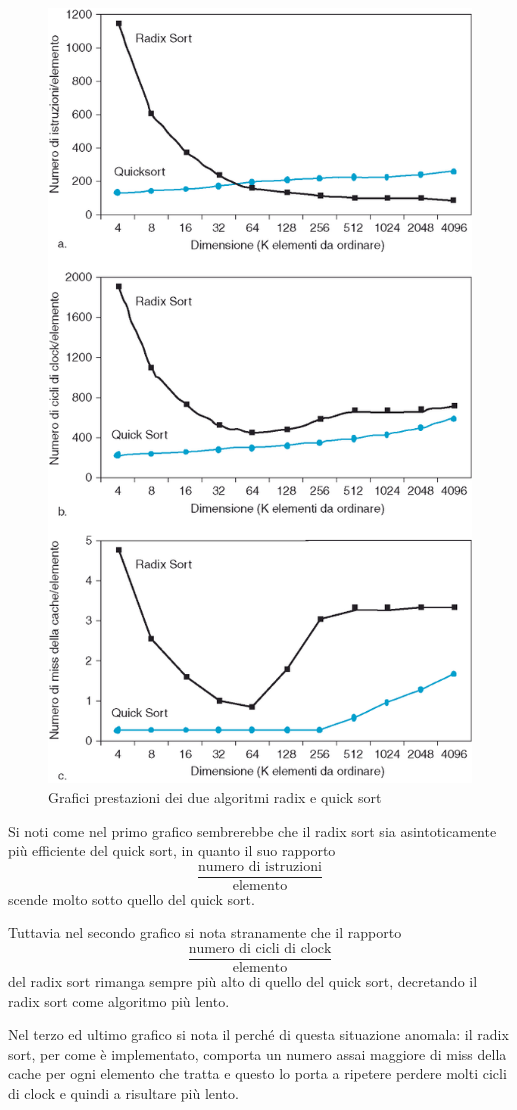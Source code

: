 \documentclass[class=book, crop=false, oneside]{standalone}
\begin{document}
\begin{figure}
	\centering
	\includegraphics[width=0.7\linewidth,keepaspectratio]{grafici}
	\caption{Grafici prestazioni dei due algoritmi radix e quick sort}
\end{figure}
Si noti come nel primo grafico sembrerebbe che il radix sort sia asintoticamente più efficiente del quick sort, in quanto il suo rapporto
\begin{equation*}
	\frac{\textrm{numero di istruzioni}}{\textrm{elemento}}
\end{equation*}
scende molto sotto quello del quick sort.

Tuttavia nel secondo grafico si nota stranamente che il rapporto
\begin{equation*}
	\frac{\textrm{numero di cicli di clock}}{\textrm{elemento}}
\end{equation*}
del radix sort rimanga sempre più alto di quello del quick sort, decretando il radix sort come algoritmo più lento.

Nel terzo ed ultimo grafico si nota il perché di questa situazione anomala: il radix sort, per come è implementato, comporta un numero assai maggiore di miss della cache per ogni elemento che tratta e questo lo porta a ripetere perdere molti cicli di clock e quindi a risultare più lento.
\end{document}

